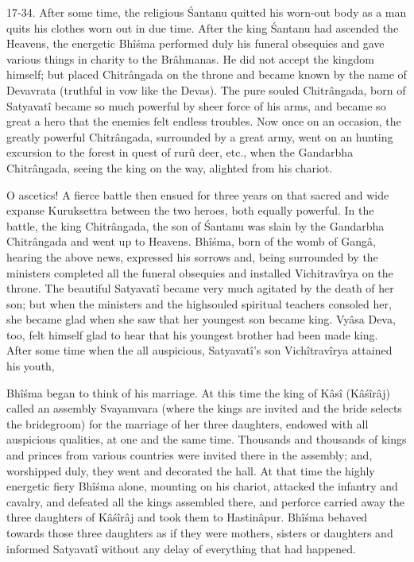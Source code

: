 17-34. After some time, the religious \'Santanu quitted his worn-out body as a man quits his clothes worn out in due time. After the king \'Santanu had ascended the Heavens, the energetic Bh\^i\'sma performed duly his funeral obsequies and gave various things in charity to the Br\^ahmanas. He did not accept the kingdom himself; but placed Chitr\^angada on the throne and became known by the name of Devavrata (truthful in vow like the Devas). The pure souled Chitr\^angada, born of Satyavat\^i became so much powerful by sheer force of his arms, and became so great a hero that the enemies felt endless troubles. Now once on an occasion, the greatly powerful Chitr\^angada, surrounded by a great army, went on an hunting excursion to the forest in quest of rur\^u deer, etc., when the Gandarbha Chitr\^angada, seeing the king on the way, alighted from his chariot.

O ascetics! A fierce battle then ensued for three years on that sacred and wide expanse Kuruksettra between the two heroes, both equally powerful. In the battle, the king Chitr\^angada, the son of \'Santanu was slain by the Gandarbha Chitr\^angada and went up to Heavens. Bh\^i\'sma, born of the womb of Gang\^a, hearing the above news, expressed his sorrows and, being surrounded by the ministers completed all the funeral obsequies and installed Vichitrav\^irya on the throne. The beautiful Satyavat\^i became very much agitated by the death of her son; but when the ministers and the highsouled spiritual teachers consoled her, she became glad when she saw that her youngest son became king. Vy\^asa  Deva, too, felt himself glad to hear that his youngest brother had been made king. After some time when the all auspicious, Satyavat\^i's son Vich\^itrav\^irya attained his youth,

Bh\^i\'sma began to think of his marriage. At this time the king of K\^as\^i (K\^a\'s\^ir\^aj) called an assembly Svayamvara (where the kings are invited and the bride selects the bridegroom) for the marriage of her three daughters, endowed with all auspicious qualities, at one and the same time. Thousands and thousands of kings and princes from various countries were invited there in the assembly; and, worshipped duly, they went and decorated the hall. At that time the highly energetic fiery Bh\^i\'sma alone, mounting on his chariot, attacked the infantry and cavalry, and defeated all the kings assembled there, and perforce carried away the three daughters of K\^a\'s\^ir\^aj and took them to Hastin\^apur. Bh\^i\'sma behaved towards those three daughters as if they were mothers, sisters or daughters and informed Satyavat\^i without any delay of everything that had happened.

